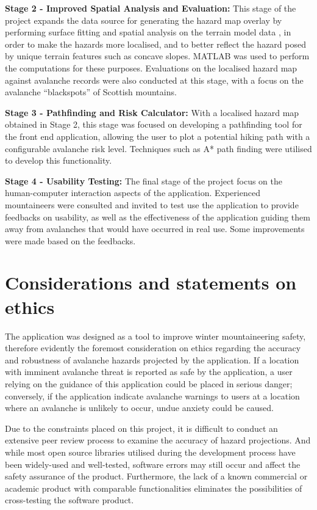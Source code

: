 \documentclass[openany]{UoYCSproject}
\begin{document}
\textbf{Stage 2 - Improved Spatial Analysis and Evaluation:} This stage of the project expands the data source for generating the hazard map overlay by performing surface fitting and spatial analysis on the terrain model data \cite{os-5}, in order to make the hazards more localised, and to better reflect the hazard posed by unique terrain features such as concave slopes. MATLAB \cite{matlab-primer} was used to perform the computations for these purposes. Evaluations on the localised hazard map against avalanche records were also conducted at this stage, with a focus on the avalanche ``blackspots'' of Scottish mountains.

\textbf{Stage 3 - Pathfinding and Risk Calculator:} With a localised hazard map obtained in Stage 2, this stage was focused on developing a pathfinding tool for the front end application, allowing the user to plot a potential hiking path with a configurable avalanche risk level. Techniques such as A* path finding \cite{cui2011based} were utilised to develop this functionality. 

\textbf{Stage 4 - Usability Testing:} The final stage of the project focus on the human-computer interaction aspects of the application. Experienced mountaineers were consulted and invited to test use the application to provide feedbacks on usability, as well as the effectiveness of the application guiding them away from avalanches that would have occurred in real use. Some improvements were made based on the feedbacks.

\section{Considerations and statements on ethics}

The application was designed as a tool to improve winter mountaineering safety, therefore evidently the foremost consideration on ethics regarding the accuracy and robustness of avalanche hazards projected by the application. If a location with imminent avalanche threat is reported as safe by the application, a user relying on the guidance of this application could be placed in serious danger; conversely, if the application indicate avalanche warnings to users at a location where an avalanche is unlikely to occur, undue anxiety could be caused.

Due to the constraints placed on this project, it is difficult to conduct an extensive peer review process to examine the accuracy of hazard projections. And while most open source libraries utilised during the development process have been widely-used and well-tested, software errors may still occur and affect the safety assurance of the product. Furthermore, the lack of a known commercial or academic product with comparable functionalities eliminates the possibilities of cross-testing the software product.
\end{document}
